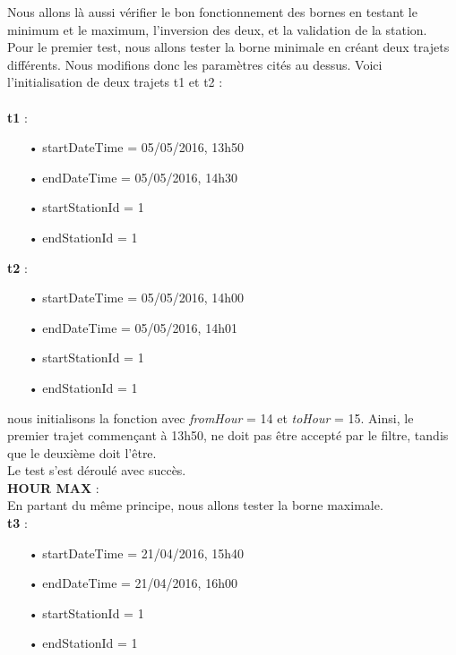 \documentclass[12pt]{article}
\begin{document}
	Nous allons là aussi vérifier le bon fonctionnement des bornes en testant le minimum et le maximum, l’inversion des deux, et la validation de la station.\\

Pour le premier test, nous allons tester la borne minimale en créant deux trajets différents. Nous modifions donc les paramètres cités au dessus. Voici l’initialisation de deux trajets t1 et t2 :\\ \\

	\textbf{t1} :
	\begin{itemize}
	\item[•] startDateTime = 05/05/2016, 13h50
	\item[•] endDateTime = 05/05/2016, 14h30
	\item[•] startStationId = 1
	\item[•] endStationId = 1\\
	\end{itemize}

	\textbf{t2} :
	\begin{itemize}
	\item[•] startDateTime = 05/05/2016, 14h00
	\item[•] endDateTime = 05/05/2016, 14h01
	\item[•] startStationId = 1
	\item[•] endStationId = 1 \\
	\end{itemize}
	
	nous initialisons la fonction avec \textit{fromHour} = 14 et \textit{toHour} = 15. Ainsi, le premier trajet commençant à 13h50, ne doit pas être accepté par le filtre, tandis que le deuxième doit l’être.\\

	Le test s’est déroulé avec succès.\\
	
	\textbf{HOUR MAX} :\\
	En partant du même principe, nous allons tester la borne maximale.\\

	\textbf{t3} :
	\begin{itemize}
	\item[•] startDateTime = 21/04/2016, 15h40
	\item[•] endDateTime = 21/04/2016, 16h00
	\item[•] startStationId = 1
	\item[•] endStationId = 1 \\
	\end{itemize}
	
\end{document}
